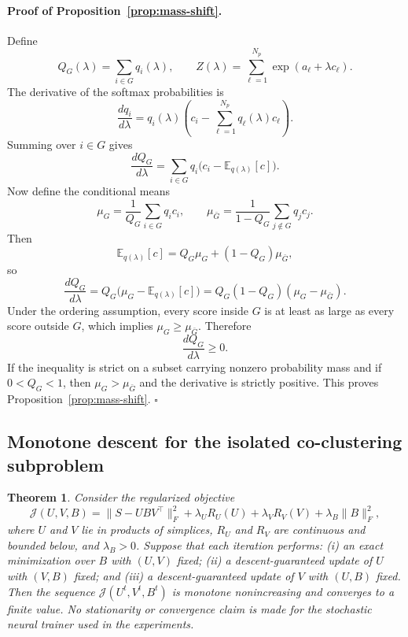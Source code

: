 \documentclass[11pt,a4paper]{article}
\newtheorem{theorem}{Theorem}
\begin{document}
\paragraph{Proof of Proposition~\ref{prop:mass-shift}.}
Define
\[
Q_G(\lambda) = \sum_{i\in G} q_i(\lambda), \qquad Z(\lambda) = \sum_{\ell=1}^{N_p}\exp(a_\ell + \lambda c_\ell).
\]
The derivative of the softmax probabilities is
\[
\frac{dq_i}{d\lambda} = q_i(\lambda)\left(c_i - \sum_{\ell=1}^{N_p} q_\ell(\lambda)c_\ell\right).
\]
Summing over $i\in G$ gives
\[
\frac{dQ_G}{d\lambda} = \sum_{i\in G} q_i\big(c_i-\mathbb{E}_{q(\lambda)}[c]\big).
\]
Now define the conditional means
\[
\mu_G = \frac{1}{Q_G}\sum_{i\in G} q_i c_i, \qquad \mu_{\bar G} = \frac{1}{1-Q_G}\sum_{j\notin G} q_j c_j.
\]
Then
\[
\mathbb{E}_{q(\lambda)}[c] = Q_G\mu_G + (1-Q_G)\mu_{\bar G},
\]
so
\[
\frac{dQ_G}{d\lambda} = Q_G\big(\mu_G - \mathbb{E}_{q(\lambda)}[c]\big) = Q_G(1-Q_G)(\mu_G-\mu_{\bar G}).
\]
Under the ordering assumption, every score inside $G$ is at least as large as every score outside $G$, which implies $\mu_G\ge \mu_{\bar G}$. Therefore
\[
\frac{dQ_G}{d\lambda} \ge 0.
\]
If the inequality is strict on a subset carrying nonzero probability mass and if $0<Q_G<1$, then $\mu_G>\mu_{\bar G}$ and the derivative is strictly positive. This proves Proposition~\ref{prop:mass-shift}. \hfill $\square$

\subsection{Monotone descent for the isolated co-clustering subproblem}

\begin{theorem}
\label{thm:alt-descent}
Consider the regularized objective
\[
\mathcal{J}(U,V,B) = \|S-UBV^\top\|_F^2 + \lambda_U R_U(U) + \lambda_V R_V(V) + \lambda_B\|B\|_F^2,
\]
where $U$ and $V$ lie in products of simplices, $R_U$ and $R_V$ are continuous and bounded below, and $\lambda_B>0$. Suppose that each iteration performs: (i) an exact minimization over $B$ with $(U,V)$ fixed; (ii) a descent-guaranteed update of $U$ with $(V,B)$ fixed; and (iii) a descent-guaranteed update of $V$ with $(U,B)$ fixed. Then the sequence $\mathcal{J}(U^t,V^t,B^t)$ is monotone nonincreasing and converges to a finite value. No stationarity or convergence claim is made for the stochastic neural trainer used in the experiments.
\end{theorem}
\end{document}
